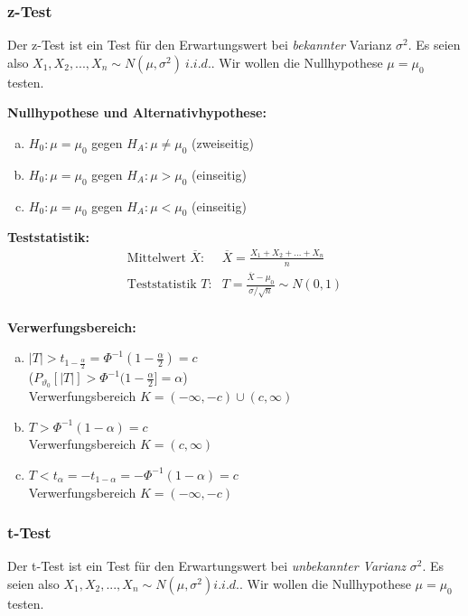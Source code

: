 \documentclass[10pt,a4paper,twocolumn]{article}
\begin{document}
\subsubsection{z-Test}
Der z-Test ist ein Test für den Erwartungswert bei \emph{bekannter} Varianz $\sigma^2$. Es seien also $X_1,X_2,...,X_n \sim N(\mu,\sigma^2)\ i.i.d.$. Wir wollen die Nullhypothese $\mu=\mu_0$ testen.

\vspace{10pt}

\textbf{Nullhypothese und Alternativhypothese:}
\begin{enumerate}[a)]
\item $H_0: \mu=\mu_0$ gegen $H_A:\mu\neq \mu_0$ (zweiseitig)
\item $H_0: \mu=\mu_0$ gegen $H_A:\mu > \mu_0$ (einseitig)
\item $H_0: \mu=\mu_0$ gegen $H_A:\mu < \mu_0$ (einseitig)
\end{enumerate}

\vspace{10pt}

\textbf{Teststatistik:}
\[
\begin{array}{ll}
	\text{Mittelwert $\overline{X}$:} & \overline{X}=\frac{X_1+X_2+...+X_n}{n} \\
	\text{Teststatistik $T$:} & T = \frac{\overline{X}-\mu_0}{\sigma/\sqrt{n}}\sim N(0,1) \\
\end{array}
\]

\vspace{10pt}

\textbf{Verwerfungsbereich:}
\begin{enumerate}[a)]
\item $|T|>t_{1-\frac{\alpha}{2}}=\Phi^{-1}(1-\frac{\alpha}{2})=c$ \\ 
      ($P_{\vartheta_0}[|T|]>\Phi^{-1}(1-\frac{\alpha}{2}]=\alpha$) \\
      Verwerfungsbereich $K=(-\infty,-c) \cup (c,\infty)$
\item $T>\Phi^{-1}(1-\alpha)=c$ \\
      Verwerfungsbereich $K=(c,\infty)$
\item $T<t_{\alpha}=-t_{1-\alpha}=-\Phi^{-1}(1-\alpha)=c$ \\
      Verwerfungsbereich $K=(-\infty,-c)$
\end{enumerate}

\subsubsection{t-Test}
Der t-Test ist ein Test für den Erwartungswert bei \emph{unbekannter Varianz} $\sigma^2$. Es seien also $X_1,X_2,...,X_n \sim N(\mu,\sigma^2) i.i.d.$. Wir wollen die Nullhypothese $\mu=\mu_0$ testen.
\end{document}
